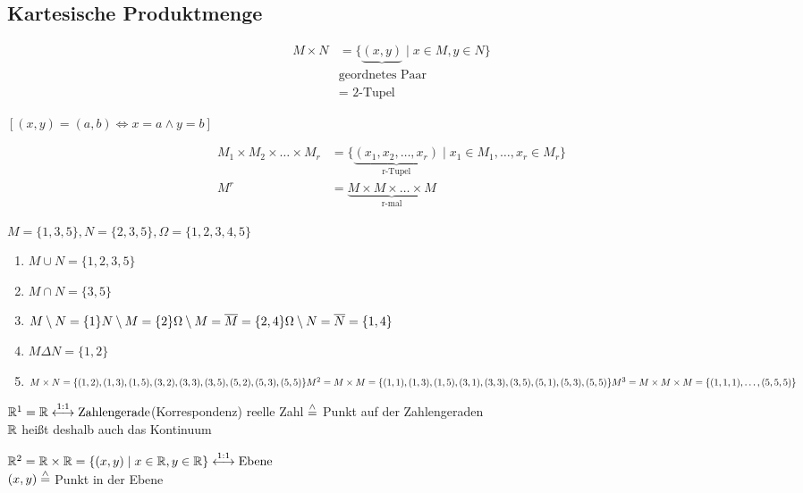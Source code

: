 
\subsection{Kartesische Produktmenge}

\begin{align*}
	M\times N &= \{\underbrace{(x,y)}\mid x\in M, y\in N\}\\
	&\text{geordnetes Paar}\\
	&\text{= 2-Tupel}
\end{align*}

$[(x,y)=(a,b) \Leftrightarrow x=a \land y=b]$

\begin{align*}
	M_1\times M_2\times \ldots \times M_r &= \{\underbrace{(x_1,x_2,\ldots,x_r)}_\text{r-Tupel}\mid x_1\in M_1, \ldots, x_r\in M_r\}\\
	M^r &= \underbrace{M\times M\times \ldots \times M}_\text{r-mal}
\end{align*}


\Bsp $M=\{1,3,5\}, N=\{2,3,5\}, \Omega=\{1,2,3,4,5\}$
\begin{enumerate}
	\item $M\cup N=\{1,2,3,5\}$
	\item $M\cap N=\{3,5\}$
	\item $M\setminus N=\{1\}\\
	N\setminus M=\{2\}\\
	\Omega\setminus M = \overline{M}=\{2,4\}\\
	\Omega\setminus N = \overline{N}=\{1,4\}$
	\item $M\Delta N=\{1,2\}$
	\item $M\times N=\{(1,2),(1,3),(1,5),(3,2),(3,3),(3,5),(5,2),(5,3),(5,5)\}\\
	M^2=M\times M=\{(1,1),(1,3),(1,5),(3,1),(3,3),(3,5),(5,1),(5,3),(5,5)\}\\
	M^3=M\times M\times M=\{(1,1,1),\ldots,(5,5,5)\}$
\end{enumerate}

\Bsps $\mathbb{R}^1 = \mathbb{R}\stackrel{1:1}{\longleftrightarrow}\text{Zahlengerade}$\qquad (Korrespondenz)
reelle Zahl $\stackrel{\wedge}{=}$ Punkt auf der Zahlengeraden\\
$\mathbb{R}$ heißt deshalb auch das Kontinuum

$\mathbb{R}^2 = \mathbb{R}\times\mathbb{R} = \{(x,y)\mid x\in\mathbb{R},y\in\mathbb{R}\}\stackrel{1:1}{\longleftrightarrow}\text{Ebene}$\\
$(x,y)\stackrel{\wedge}{=}$ Punkt in der Ebene


